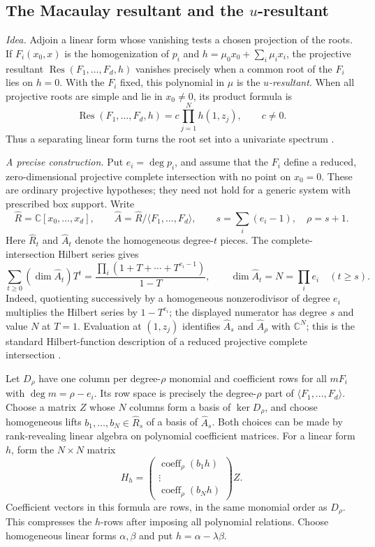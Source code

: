 \documentclass[12pt]{article}
\def\C{\mathbb{C}}
\DeclareMathOperator{\Res}{Res}
\theoremstyle{definition}
\theoremstyle{remark}
\begin{document}
\subsection{The Macaulay resultant and the \texorpdfstring{$u$}{u}-resultant}\label{sec:macaulay}

\emph{Idea.} Adjoin a linear form whose vanishing tests a chosen projection of the roots.
If $F_i(x_0,x)$ is the homogenization of $p_i$ and
$h=\mu_0x_0+\sum_i\mu_ix_i$, the projective resultant
$\Res(F_1,\ldots,F_d,h)$ vanishes precisely when a common root of the $F_i$ lies on $h=0$.
With the $F_i$ fixed, this polynomial in $\mu$ is the \emph{$u$-resultant}.
When all projective roots are simple and lie in $x_0\ne0$, its product formula is
\[
  \Res(F_1,\ldots,F_d,h)=c\prod_{j=1}^N h(1,z_j),\qquad c\ne0.
\]
Thus a separating linear form turns the root set into a univariate spectrum
\cite{vanderwaerden1950modern,gelfand1994discriminants}.

\emph{A precise construction.} Put $e_i=\deg p_i$, and assume that the $F_i$ define a
reduced, zero-dimensional projective complete intersection with no point on $x_0=0$.
These are ordinary projective hypotheses; they need not hold for a generic system with
prescribed box support. Write
\[
  \widehat R=\C[x_0,\ldots,x_d],\qquad
  \widehat A=\widehat R/\langle F_1,\ldots,F_d\rangle,
  \qquad s=\sum_i(e_i-1),\quad \rho=s+1.
\]
Here $\widehat R_t$ and $\widehat A_t$ denote the homogeneous degree-$t$ pieces.
The complete-intersection
Hilbert series gives
\[
  \sum_{t\ge0}(\dim\widehat A_t)T^t
   =\frac{\prod_i(1+T+\cdots+T^{e_i-1})}{1-T},
  \qquad \dim\widehat A_t=N=\prod_i e_i\quad(t\ge s).
\]
Indeed, quotienting successively by a homogeneous nonzerodivisor of degree $e_i$
multiplies the Hilbert series by $1-T^{e_i}$; the displayed numerator has degree $s$
and value $N$ at $T=1$. Evaluation at $(1,z_j)$ identifies $\widehat A_s$ and
$\widehat A_\rho$ with
$\C^N$; this is the standard Hilbert-function description of a reduced projective
complete intersection \cite[Chs.~3 and~5]{cox2005using}.

Let $D_\rho$ have one column per degree-$\rho$ monomial and coefficient rows for all
$mF_i$ with $\deg m=\rho-e_i$. Its row space is precisely the degree-$\rho$ part of
$\langle F_1,\ldots,F_d\rangle$. Choose a matrix $Z$ whose $N$ columns form a basis of
$\ker D_\rho$, and choose homogeneous lifts $b_1,\ldots,b_N\in\widehat R_s$
of a basis of $\widehat A_s$.
Both choices can be made by rank-revealing linear algebra on polynomial coefficient
matrices. For a linear form $h$, form the $N\times N$ matrix
\begin{equation}\label{eq:macaulay-compression}
  H_h=\begin{pmatrix}
    \operatorname{coeff}_\rho(b_1h)\\[-1mm]\vdots\\
    \operatorname{coeff}_\rho(b_Nh)
  \end{pmatrix}Z.
\end{equation}
Coefficient vectors in this formula are rows, in the same monomial order as $D_\rho$.
This compresses the $h$-rows after imposing all polynomial relations.
Choose homogeneous linear forms $\alpha,\beta$ and put $h=\alpha-\lambda\beta$.
\end{document}
